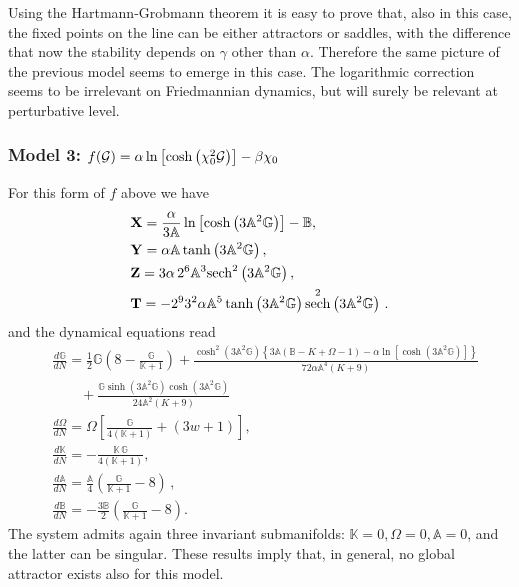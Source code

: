 \documentclass[a4paper,aps,onecolumn,nofootinbib]{revtex4}
\def\DerN#1{\frac{d #1}{d N}}
\def\G{{\cal G}}
\DeclareMathOperator{\sech}{sech}
\begin{document}
Using the Hartmann-Grobmann theorem it is easy to prove that, also in this case, the fixed points on the line can be either attractors or saddles, with the difference that now the stability depends on $\gamma$ other than $\alpha$.  Therefore the same picture of the previous model seems to emerge in this case. The logarithmic correction seems to be irrelevant on Friedmannian dynamics, but will surely be relevant at  perturbative level.


\subsubsection{Model 3: $f(\G)=\alpha \ln\left[\cosh\left(\chi_0^2 \G\right)\right]-\beta \chi_0$}
For this form of $f$ above we have 
 \begin{align} \label{XYT}
& {\bf X}=\frac{\alpha} {3 \mathbb{A}} \ln \left[\cosh \left(3 \mathbb{A}^2 \mathbb{G}\right)\right]-
   \mathbb{B},\\
&  {\bf Y}=\alpha  \mathbb{A} \tanh \left(3 \mathbb{A}^2 \mathbb{G}\right) ,\\
& {\bf Z}=3\alpha\, 2^6 \mathbb{A}^3
   \text{sech}^2\left(3 \mathbb{A}^2 \mathbb{G}\right),\\
&  {\bf T}= -2^9 3^2 \alpha  \mathbb{A}^5 \tanh \left(3 \mathbb{A}^2 \mathbb{G}\right)
   \sech^2\left(3 \mathbb{A}^2 \mathbb{G}\right)\,.
\end{align}
and the dynamical equations read
\begin{equation}\label{DynSysEx2b}
\begin{split}
&\DerN{\mathbb{G}}= \frac{1}{2}
   \mathbb{G} \left(8-\frac{\mathbb{G}}{\mathbb{K}+1}\right)+\frac{\cosh ^2\left(3 \mathbb{A}^2 \mathbb{G}\right) \left\{3 \mathbb{A}( \mathbb{B}-K+ \Omega -1)-\alpha  \ln\left[\cosh \left(3 \mathbb{A}^2 \mathbb{G}\right)\right]\right\}}{72
   \alpha  \mathbb{A}^4 (K+9)}\\ 
& ~~~~~~~~~+\frac{\mathbb{G} \sinh \left(3 \mathbb{A}^2 \mathbb{G}\right) \cosh \left(3 \mathbb{A}^2
   \mathbb{G}\right)}{24 \mathbb{A}^2 (K+9)}\\
&\DerN{\Omega} =\Omega  \left[\frac{\mathbb{G}}{4 (\mathbb{K}+1)}+(3 w+1)\right],\\ 
&\DerN{\mathbb{K} }=-\frac{\mathbb{K}\, \mathbb{G} }{4(
   \mathbb{K}+1)},\\
&\DerN{\mathbb{A}}=\frac{\mathbb{A}}{4}  \left(\frac{\mathbb{G}}{\mathbb{K}+1}-8\right)\,,\\
&\DerN{\mathbb{B}}=-\frac{3 \mathbb{B} }{2} \left(\frac{\mathbb{G}}{\mathbb{K}+1}-8\right).
\end{split}
\end{equation}
The system admits  again three invariant submanifolds: $\mathbb{K}=0, \Omega=0,\mathbb{A}=0$, and the latter can be singular. These results imply that, in general, no global attractor exists also for this model.
\end{document}
